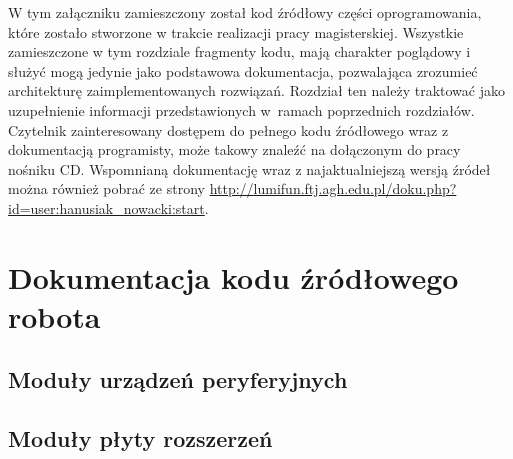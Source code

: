 \label{ch:source-code}
W tym załączniku zamieszczony został kod źródłowy części oprogramowania,
które zostało stworzone w trakcie realizacji pracy magisterskiej. Wszystkie
zamieszczone w tym rozdziale fragmenty kodu, mają charakter poglądowy i służyć
mogą jedynie jako podstawowa dokumentacja, pozwalająca zrozumieć architekturę
zaimplementowanych rozwiązań. Rozdział ten należy traktować jako
uzupełnienie informacji przedstawionych w~ramach poprzednich rozdziałów.
Czytelnik zainteresowany dostępem do pełnego kodu źródłowego wraz z dokumentacją
programisty, może takowy znaleźć na dołączonym do pracy nośniku CD. Wspomnianą
dokumentację wraz z najaktualniejszą wersją źródeł można również pobrać ze
strony \url{http://lumifun.ftj.agh.edu.pl/doku.php?id=user:hanusiak_nowacki:start}.

\section{Dokumentacja kodu źródłowego robota}
\newpage
\subsection{Moduły urządzeń peryferyjnych}

\newpage


\subsection{Moduły płyty rozszerzeń}









